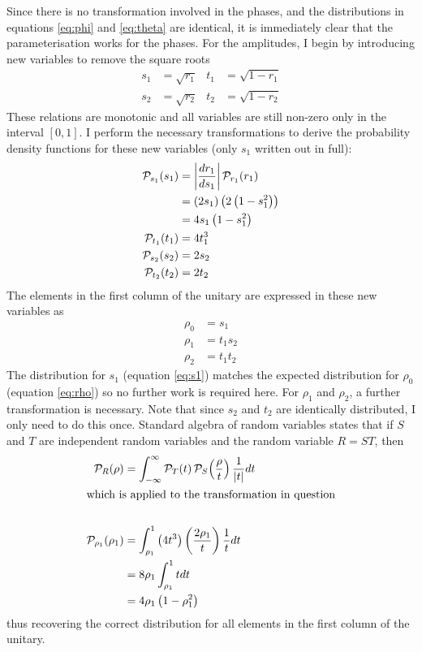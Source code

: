 Since there is no transformation involved in the phases, and the distributions
in equations \ref{eq:phi} and \ref{eq:theta} are identical, it is immediately
clear that the parameterisation works for the phases. For the amplitudes, I
begin by introducing new variables to remove the square roots
\begin{align}
  s_{1} &= \sqrt{r_{1}} & t_{1} &= \sqrt{1-r_{1}} \\
  s_{2} &= \sqrt{r_{2}} & t_{2} &= \sqrt{1-r_{2}}
\end{align}
These relations are monotonic and all variables are still non-zero only in the
interval \(\left[ 0,1 \right]\). I perform the necessary transformations to
derive the probability density functions for these new variables (only \(s_{1}\)
written out in full):
\begin{align}
  \mathcal{P}_{s_{1}} \!\left(s_{1}\right) &= \left| \frac{dr_{1}}{ds_{1}} \right|
    \mathcal{P}_{r_{1}} \!\left(r_{1}\right) \\
  &= \left( 2s_{1} \right) \left( 2 \left( 1-s_{1}^{2} \right) \right) \\
  \label{eq:s1}
  &= 4 s_{1} \left( 1-s_{1}^{2} \right) \\
  \label{eq:t1}
  \mathcal{P}_{t_{1}} \!\left(t_{1}\right) &= 4 t_{1}^{3} \\
  \label{eq:s2}
  \mathcal{P}_{s_{2}} \!\left(s_{2}\right) &= 2 s_{2} \\
  \label{eq:t2}
  \mathcal{P}_{t_{2}} \!\left(t_{2}\right) &= 2 t_{2}
\end{align}
The elements in the first column of the unitary are expressed in these new
variables as
\begin{align}
  \rho_{0} &= s_{1} \\
  \rho_{1} &= t_{1} s_{2} \\
  \rho_{2} &= t_{1} t_{2}
\end{align}
The distribution for \(s_{1}\) (equation \ref{eq:s1}) matches the expected
distribution for \(\rho_{0}\) (equation \ref{eq:rho}) so no further work is
required here. For \(\rho_{1}\) and \(\rho_{2}\), a further transformation is
necessary. Note that since \(s_{2}\) and \(t_{2}\) are identically distributed,
I only need to do this once. Standard algebra of random variables states that if
\(S\) and \(T\) are independent random variables and the random variable \(R =
ST\), then
\begin{align}
  \mathcal{P}_{R} \!\left(\rho\right) &= \int_{-\infty}^{\infty} \mathcal{P}_{T} \!\left(t\right)
    \mathcal{P}_{S} \!\left(\frac{\rho}{t}\right) \frac{1}{\left|t\right|} dt \\
  \intertext{which is applied to the transformation in question} \\
  \mathcal{P}_{\rho_{1}} \!\left(\rho_{1}\right) &= \int_{\rho_{1}}^{1} \left( 4 t^{3} \right)
    \left( \frac{2 \rho_{1}}{t} \right) \frac{1}{t} dt \\
  &= 8 \rho_{1} \int_{\rho_{1}}^{1} t dt \\
  &= 4 \rho_{1} \left( 1-\rho_{1}^{2} \right)
\end{align}
thus recovering the correct distribution for all elements in the first column of
the unitary.

